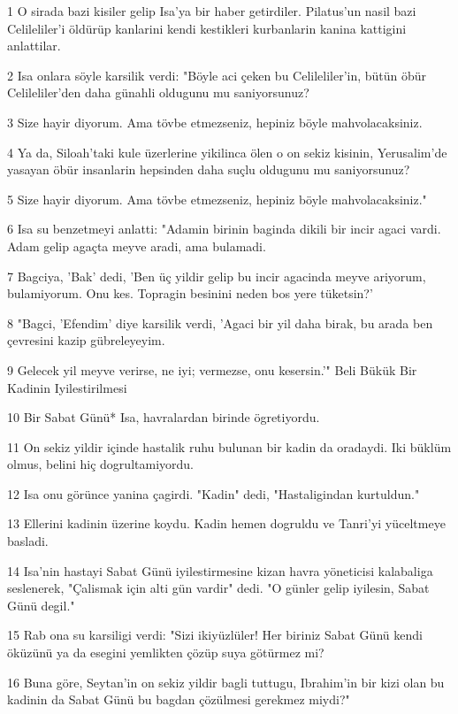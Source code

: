 \par 1 O sirada bazi kisiler gelip Isa'ya bir haber getirdiler. Pilatus'un nasil bazi Celileliler'i öldürüp kanlarini kendi kestikleri kurbanlarin kanina kattigini anlattilar.
\par 2 Isa onlara söyle karsilik verdi: "Böyle aci çeken bu Celileliler'in, bütün öbür Celileliler'den daha günahli oldugunu mu saniyorsunuz?
\par 3 Size hayir diyorum. Ama tövbe etmezseniz, hepiniz böyle mahvolacaksiniz.
\par 4 Ya da, Siloah'taki kule üzerlerine yikilinca ölen o on sekiz kisinin, Yerusalim'de yasayan öbür insanlarin hepsinden daha suçlu oldugunu mu saniyorsunuz?
\par 5 Size hayir diyorum. Ama tövbe etmezseniz, hepiniz böyle mahvolacaksiniz."
\par 6 Isa su benzetmeyi anlatti: "Adamin birinin baginda dikili bir incir agaci vardi. Adam gelip agaçta meyve aradi, ama bulamadi.
\par 7 Bagciya, 'Bak' dedi, 'Ben üç yildir gelip bu incir agacinda meyve ariyorum, bulamiyorum. Onu kes. Topragin besinini neden bos yere tüketsin?'
\par 8 "Bagci, 'Efendim' diye karsilik verdi, 'Agaci bir yil daha birak, bu arada ben çevresini kazip gübreleyeyim.
\par 9 Gelecek yil meyve verirse, ne iyi; vermezse, onu kesersin.'" Beli Bükük Bir Kadinin Iyilestirilmesi
\par 10 Bir Sabat Günü* Isa, havralardan birinde ögretiyordu.
\par 11 On sekiz yildir içinde hastalik ruhu bulunan bir kadin da oradaydi. Iki büklüm olmus, belini hiç dogrultamiyordu.
\par 12 Isa onu görünce yanina çagirdi. "Kadin" dedi, "Hastaligindan kurtuldun."
\par 13 Ellerini kadinin üzerine koydu. Kadin hemen dogruldu ve Tanri'yi yüceltmeye basladi.
\par 14 Isa'nin hastayi Sabat Günü iyilestirmesine kizan havra yöneticisi kalabaliga seslenerek, "Çalismak için alti gün vardir" dedi. "O günler gelip iyilesin, Sabat Günü degil."
\par 15 Rab ona su karsiligi verdi: "Sizi ikiyüzlüler! Her biriniz Sabat Günü kendi öküzünü ya da esegini yemlikten çözüp suya götürmez mi?
\par 16 Buna göre, Seytan'in on sekiz yildir bagli tuttugu, Ibrahim'in bir kizi olan bu kadinin da Sabat Günü bu bagdan çözülmesi gerekmez miydi?"
